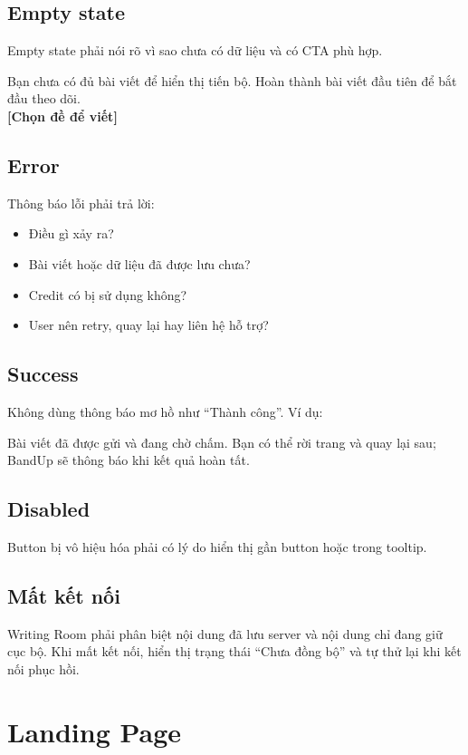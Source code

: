 \documentclass[11pt,a4paper]{article}
\begin{document}
\subsection{Empty state}
Empty state phải nói rõ vì sao chưa có dữ liệu và có CTA phù hợp.
\begin{copybox}
Bạn chưa có đủ bài viết để hiển thị tiến bộ. Hoàn thành bài viết đầu tiên để bắt đầu theo dõi.\\
\textbf{[Chọn đề để viết]}
\end{copybox}

\subsection{Error}
Thông báo lỗi phải trả lời:
\begin{itemize}
  \item Điều gì xảy ra?
  \item Bài viết hoặc dữ liệu đã được lưu chưa?
  \item Credit có bị sử dụng không?
  \item User nên retry, quay lại hay liên hệ hỗ trợ?
\end{itemize}

\subsection{Success}
Không dùng thông báo mơ hồ như ``Thành công''. Ví dụ:
\begin{copybox}
Bài viết đã được gửi và đang chờ chấm. Bạn có thể rời trang và quay lại sau; BandUp sẽ thông báo khi kết quả hoàn tất.
\end{copybox}

\subsection{Disabled}
Button bị vô hiệu hóa phải có lý do hiển thị gần button hoặc trong tooltip.

\subsection{Mất kết nối}
Writing Room phải phân biệt nội dung đã lưu server và nội dung chỉ đang giữ cục bộ. Khi mất kết nối, hiển thị trạng thái ``Chưa đồng bộ'' và tự thử lại khi kết nối phục hồi.

\section{Landing Page}
\end{document}
